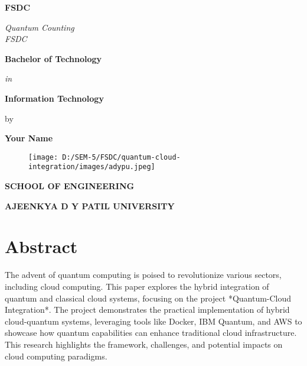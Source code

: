 \documentclass[12pt,a4paper]{article}
\newcommand{\mydegree}{Bachelor of Technology}
\newcommand{\degreename}{Information Technology}
\newcommand{\mysupervisor}{Your Name}
\newcommand{\mydep}{School of Engineering}
\begin{document}
\thispagestyle{empty}
\begin{center}
    {\large {\bfseries FSDC} \par}
    \vspace{3\baselineskip}
    {\textit{Quantum Counting}\\
    \textit{FSDC}}\par
    \vspace{\baselineskip}
    {\large \bf \mydegree \par} 
    \vspace{\baselineskip}
    {\textit{in} \par}
    \vspace{\baselineskip}
    {{\large {\bf \degreename \\ }} \par}
    \vspace{1.5\baselineskip}
    {by \par}
    \vspace{\baselineskip}
    {{\large \bf \mysupervisor} \par}
    \vspace{1.5\baselineskip}
    {\begin{figure}[!h]
        \centering
        \texttt{[image: D:/SEM-5/FSDC/quantum-cloud-integration/images/adypu.jpeg]}
    \end{figure}}
    \vspace{1.5\baselineskip}
    {\bf \MakeUppercase{\mydep} \par}
    \vspace{1ex}
    {\bf \uppercase{Ajeenkya D Y Patil University} \par}
\end{center}

\newpage

\section*{Abstract}
The advent of quantum computing is poised to revolutionize various sectors, including cloud computing. This paper explores the hybrid integration of quantum and classical cloud systems, focusing on the project *Quantum-Cloud Integration*. The project demonstrates the practical implementation of hybrid cloud-quantum systems, leveraging tools like Docker, IBM Quantum, and AWS to showcase how quantum capabilities can enhance traditional cloud infrastructure. This research highlights the framework, challenges, and potential impacts on cloud computing paradigms.
\end{document}
